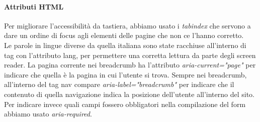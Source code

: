 \paragraph{Attributi HTML} Per migliorare l'accessibilità da tastiera, abbiamo usato i \textit{tabindex} che servono a dare un ordine di focus agli elementi delle pagine che non ce l'hanno corretto.\\
Le parole in lingue diverse da quella italiana sono state racchiuse all’interno di tag con l’attributo lang, per permettere una corretta lettura da parte degli screen reader. La pagina corrente nei breadcrumb ha l'attributo \textit{aria-current="page"} per indicare che quella è la pagina in cui l'utente si trova. Sempre nei breadcrumb, all'interno del tag nav compare \textit{aria-label="breadcrumb"} per indicare che il contenuto di quella navigazione indica la posizione dell'utente all'interno del sito.\\
Per indicare invece quali campi fossero obbligatori nella compilazione del form abbiamo usato \textit{aria-required}.